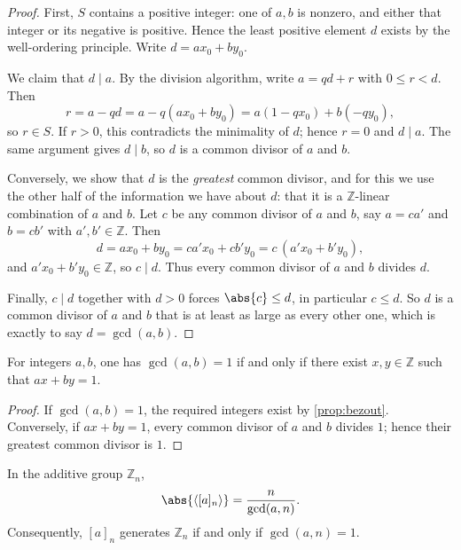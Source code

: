 \begin{proof}
	First, \(S\) contains a positive integer: one of \(a,b\) is nonzero, and either that
	integer or its negative is positive. Hence the least positive element \(d\) exists by
	the well-ordering principle. Write \(d=ax_0+by_0\).

	We claim that \(d\mid a\). By the division algorithm, write \(a=qd+r\) with
	\(0\leq r<d\). Then
	\[
		r=a-qd=a-q(ax_0+by_0)=a(1-qx_0)+b(-qy_0),
	\]
	so \(r\in S\). If \(r>0\), this contradicts the minimality of \(d\); hence \(r=0\)
	and \(d\mid a\). The same argument gives \(d\mid b\), so \(d\) is a common divisor
	of \(a\) and \(b\).

	Conversely, we show that \(d\) is the \emph{greatest} common divisor, and for this we
	use the other half of the information we have about \(d\): that it is a
	\(\mathbb Z\)-linear combination of \(a\) and \(b\). Let \(c\) be any common divisor
	of \(a\) and \(b\), say \(a=ca'\) and \(b=cb'\) with \(a',b'\in\mathbb Z\). Then
	\[
		d=ax_0+by_0=ca'x_0+cb'y_0=c\,(a'x_0+b'y_0),
	\]
	and \(a'x_0+b'y_0\in\mathbb Z\), so \(c\mid d\). Thus every common divisor of \(a\)
	and \(b\) divides \(d\).

	Finally, \(c\mid d\) together with \(d>0\) forces \(\abs{c}\leq d\), in particular
	\(c\leq d\). So \(d\) is a common divisor of \(a\) and \(b\) that is at least as
	large as every other one, which is exactly to say \(d=\gcd(a,b)\).
\end{proof}

\begin{corollary}\label{cor:bezout-criterion}
	For integers \(a,b\), one has \(\gcd(a,b)=1\) if and only if there exist
	\(x,y\in\mathbb Z\) such that \(ax+by=1\).
\end{corollary}

\begin{proof}
	If \(\gcd(a,b)=1\), the required integers exist by \autoref{prop:bezout}. Conversely,
	if \(ax+by=1\), every common divisor of \(a\) and \(b\) divides \(1\); hence their
	greatest common divisor is \(1\).
\end{proof}

\begin{proposition}\label{prop:order-in-Zn}
	In the additive group \(\mathbb Z_n\),
	\[
		\abs{\langle[a]_n\rangle}=\frac{n}{\gcd(a,n)}.
	\]
	Consequently, \([a]_n\) generates \(\mathbb Z_n\) if and only if
	\(\gcd(a,n)=1\).
\end{proposition}

